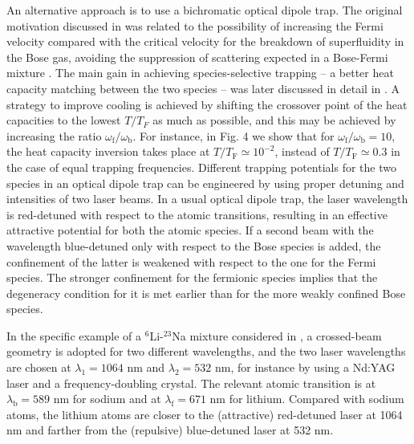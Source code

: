 \documentclass[pra,letterpaper,twocolumn,showpacs,superscriptaddress]{revtex4}
\begin{document}
An alternative approach is to use a bichromatic optical dipole trap. The original motivation discussed in \cite{Onofrio2002} was 
related to the possibility of increasing the Fermi velocity compared with the critical velocity for the breakdown of superfluidity in the 
Bose gas, avoiding the suppression of scattering expected in a Bose-Fermi mixture \cite{Timmermans1998}. 
The main gain in achieving species-selective trapping -- a better heat capacity matching between the 
two species -- was later discussed in detail in \cite{Presilla2003}.
A strategy to improve cooling is achieved by shifting the crossover point of the heat capacities to the lowest $T/T_F$ as much as possible, and 
this may be achieved by increasing the ratio $\omega_\mathrm{f}/\omega_\mathrm{b}$. 
For instance, in Fig. 4 we show that for $\omega_\mathrm{f}/\omega_\mathrm{b}=10$, the heat capacity inversion 
takes place at $T/T_\mathrm{F}\simeq 10^{-2}$, instead of $T/T_\mathrm{F}\simeq 0.3$ in the case of equal trapping frequencies. 
Different trapping potentials for the two species in an optical dipole trap can be engineered by using proper detuning and intensities of two laser beams. 
In a usual optical dipole trap, the laser wavelength is red-detuned with respect to the atomic 
transitions, resulting in an effective attractive potential for both the atomic species. 
If a second beam with the wavelength blue-detuned only with respect to the Bose species is added, the 
confinement of the latter is weakened with respect to the one for the Fermi species. 
The stronger confinement for the fermionic species implies that the degeneracy 
condition for it is met earlier than for the more weakly confined Bose species. 

In the specific example of a ${}^6$Li-${}^{23}$Na mixture considered in \cite{Onofrio2002}, a 
crossed-beam geometry is adopted for two different wavelengths, and the two laser wavelengths 
are chosen at $\lambda_1=1064$ nm and $\lambda_2=532$ nm, for instance by using a Nd:YAG laser 
and a frequency-doubling crystal. The relevant atomic transition is at 
$\lambda_\mathrm{b}=589$ nm for sodium and at $\lambda_\mathrm{f}=671$ nm for lithium. 
Compared with sodium atoms, the lithium atoms are closer to the (attractive) red-detuned laser at 1064 nm 
and farther from the (repulsive) blue-detuned laser at 532 nm.     
\end{document}
